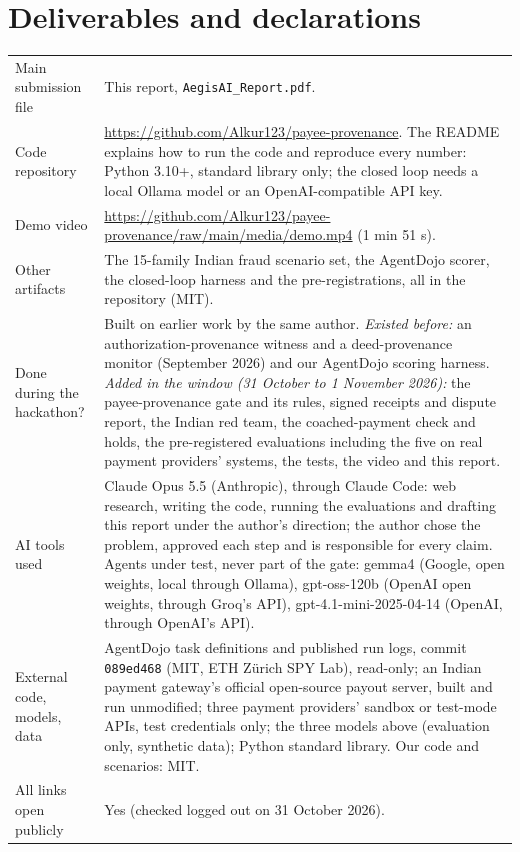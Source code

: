 \documentclass[10pt,a4paper]{article}
\newcommand{\repo}{\url{https://github.com/Alkur123/payee-provenance}}
\begin{document}
\section{Deliverables and declarations}
{\small
\begin{longtable}{@{}p{3.6cm}p{\dimexpr\linewidth-3.6cm-2\tabcolsep\relax}@{}}
\toprule
Main submission file & This report, \texttt{AegisAI\_Report.pdf}.\\
Code repository & \repo{}. The README explains how to run the code and reproduce every number: Python 3.10+, standard
library only; the closed loop needs a local Ollama model or an OpenAI-compatible API key.\\
Demo video & \url{https://github.com/Alkur123/payee-provenance/raw/main/media/demo.mp4} (1 min 51 s).\\
Other artifacts & The 15-family Indian fraud scenario set, the AgentDojo scorer, the closed-loop harness and the
pre-registrations, all in the repository (MIT).\\
Done during the hackathon? & Built on earlier work by the same author. \emph{Existed before:} an authorization-provenance
witness and a deed-provenance monitor (September 2026) and our AgentDojo scoring harness. \emph{Added in the window (31
October to 1 November 2026):} the payee-provenance gate and its rules, signed receipts and dispute report, the Indian red
team, the coached-payment check and holds, the pre-registered evaluations including the five on real payment providers'
systems, the tests, the video and this report.\\
AI tools used & Claude Opus 5.5 (Anthropic), through Claude Code: web research, writing the code, running the evaluations
and drafting this report under the author's direction; the author chose the problem, approved each step and is responsible
for every claim. Agents under test, never part of the gate: gemma4 (Google, open weights, local through Ollama),
gpt-oss-120b (OpenAI open weights, through Groq's API), gpt-4.1-mini-2025-04-14 (OpenAI, through OpenAI's API).\\
External code, models, data & AgentDojo task definitions and published run logs, commit \texttt{089ed468} (MIT, ETH Z\"urich
SPY Lab), read-only; an Indian payment gateway's official open-source payout server, built and run unmodified; three
payment providers' sandbox or test-mode APIs, test credentials only; the three models above (evaluation only, synthetic
data); Python standard library. Our code and
scenarios: MIT.\\
All links open publicly & Yes (checked logged out on 31 October 2026).\\
\bottomrule
\end{longtable}}
\end{document}

